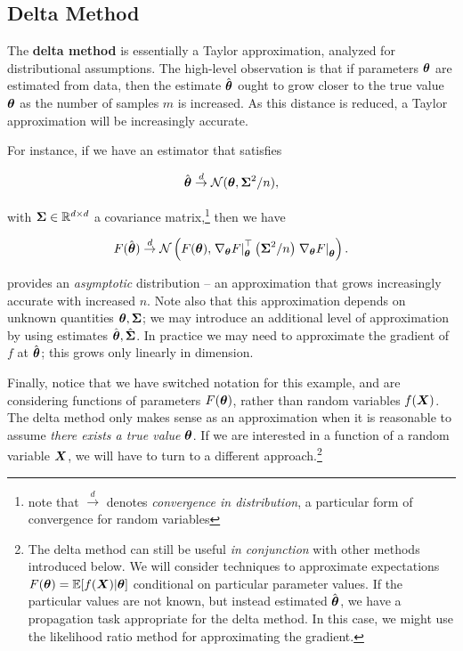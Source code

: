 \documentclass[../primer.tex]{subfiles}
\begin{document}
\subsection{Delta Method}
The \textbf{delta method} is essentially a Taylor approximation, analyzed for
distributional assumptions. The high-level observation is that if parameters
$\boldsymbol{\theta}$ are estimated from data, then the estimate $\hat{\boldsymbol{\theta}}$ ought to
grow closer to the true value $\boldsymbol{\theta}$ as the number of samples $m$ is
increased. As this distance is reduced, a Taylor approximation will be
increasingly accurate.

For instance,\cite{van1998asymptotic} if we have an estimator that satisfies

\begin{equation} \label{eq:ch4-delta-est}
  \hat{\boldsymbol{\theta}} \stackrel{d}{\to} \mathcal{N}(\boldsymbol{\theta}, \boldsymbol{\Sigma}^2/n),
\end{equation}

\noindent with $\boldsymbol{\Sigma}\in\mathbb{R}^{d\times d}$ a covariance matrix,\footnote{note
  that $\stackrel{d}{\to}$ denotes \emph{convergence in distribution}, a
  particular form of convergence for random variables} then we have

\begin{equation} \label{eq:ch4-delta-fcn}
  F(\hat{\v\theta}) \stackrel{d}{\to} %
  \dN\left(F(\v\theta),
    \left.\nabla_{\v\theta}F\right|_{\v\theta}^{\top}\left(\m\Sigma^2/n\right) %
      \left.\nabla_{\v\theta}F\right|_{\v\theta}\right).
\end{equation}

\noindent {} provides an \emph{asymptotic} distribution --
an approximation that grows increasingly accurate with increased $n$. Note also
that this approximation depends on unknown quantities $\boldsymbol{\theta},\boldsymbol{\Sigma}$; we
may introduce an additional level of approximation by using estimates
$\hat{\boldsymbol{\theta}},\hat{\boldsymbol{\Sigma}}$. In practice we may need to approximate the
gradient of $f$ at $\hat{\boldsymbol{\theta}}$; this grows only linearly in dimension.

Finally, notice that we have switched notation for this example, and are
considering functions of parameters $F(\boldsymbol{\theta})$, rather than random variables
$f(\boldsymbol{X})$. The delta method only makes sense as an approximation when it is
reasonable to assume \emph{there exists a true value} $\boldsymbol{\theta}$. If we are
interested in a function of a random variable $\boldsymbol{X}$, we will have to turn to a
different approach.\footnote{The delta method can still be useful \emph{in
    conjunction} with other methods introduced below. We will consider
  techniques to approximate expectations $F(\boldsymbol{\theta}) = \mathbb{E}[f(\boldsymbol{X})|\boldsymbol{\theta}]$
  conditional on particular parameter values. If the particular values are not
  known, but instead estimated $\hat{\boldsymbol{\theta}}$, we have a propagation task
  appropriate for the delta method. In this case, we might use the likelihood
  ratio method for approximating the gradient.\cite{l1990unified}}
\end{document}
